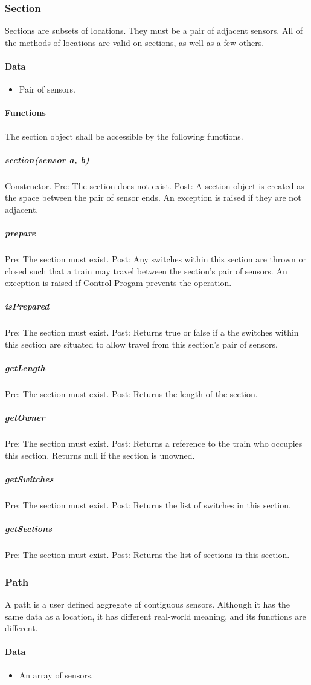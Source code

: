 \documentclass[a4paper,11pt,notitlepage]{article}
\def\CS{Control Progam\xspace}
\begin{document}
\subsubsection{Section}
Sections are subsets of locations. They must be a pair of adjacent sensors. All of the methods of locations are valid on sections, as well as a few others.
\paragraph{Data}
\begin{itemize}
\item Pair of sensors.
\end{itemize}
\paragraph{Functions}
The section object shall be accessible by the following functions.
\subparagraph{section(sensor a, b)} Constructor. Pre: The section does not exist. Post: A section object is created as the space between the pair of sensor ends. An exception is raised if they are not adjacent.
\subparagraph{prepare} Pre: The section must exist. Post: Any switches within this section are thrown or closed such that a train may travel between the section's pair of sensors. An exception is raised if \CS prevents the operation.
\subparagraph{isPrepared} Pre: The section must exist. Post: Returns true or false if a the switches within this section are situated to allow travel from this section's pair of sensors.
\subparagraph{getLength} Pre: The section must exist. Post: Returns the length of the section.
\subparagraph{getOwner} Pre: The section must exist. Post: Returns a reference to the train who occupies this section. Returns null if the section is unowned.
\subparagraph{getSwitches} Pre: The section must exist. Post: Returns the list of switches in this section.
\subparagraph{getSections} Pre: The section must exist. Post: Returns the list of sections in this section.

\subsubsection{Path}
A path is a user defined aggregate of contiguous sensors. Although it has the same data as a location, it has different real-world meaning, and its functions are different.
\paragraph{Data}
\begin{itemize}
\item An array of sensors.
\end{itemize}
\end{document}
